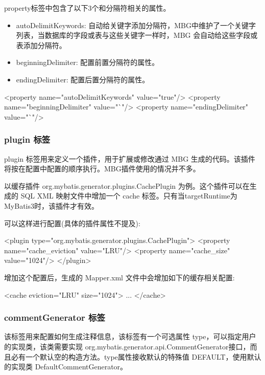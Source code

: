 property标签中包含了以下3个和分隔符相关的属性。
\begin{itemize}
    \item autoDelimitKeywords: 自动给关键字添加分隔符，MBG中维护了一个关键字列表，当数据库的字段或表与这些关键字一样时，MBG 会自动给这些字段或表添加分隔符。
    \item beginningDelimiter: 配置前置分隔符的属性。
    \item endingDelimiter: 配置后置分隔符的属性。
\end{itemize}

\begin{xml}
<property name="autoDelimitKeywords" value="true"/>
<property name="beginningDelimiter" value="`"/>
<property name="endingDelimiter" value="`"/>
\end{xml}

\subsubsection*{plugin 标签}

plugin 标签用来定义一个插件，用于扩展或修改通过 MBG 生成的代码。该插件将按在配置中配置的顺序执行。MBG插件使用的情况并不多。

以缓存插件 org.mybatis.generator.plugins.CachePlugin 为例。这个插件可以在生成的 SQL XML 映射文件中增加一个 cache 标签。只有当targetRuntime为MyBatis3时，该插件才有效。

可以这样进行配置(具体的插件属性不提及):

\begin{xml}
<plugin type="org.mybatis.generator.plugins.CachePlugin">
    <property name="cache_eviction" value="LRU"/>
    <property name="cache_size" value="1024"/>
</plugin>
\end{xml}

增加这个配置后，生成的 Mapper.xml 文件中会增加如下的缓存相关配置:

\begin{xml}
<cache eviction="LRU" size="1024">
...
</cache>
\end{xml}

\subsubsection*{commentGenerator 标签}

该标签用来配置如何生成注释信息，该标签有一个可选属性 type，可以指定用户的实现类，该类需要实现 org.mybatis.generator.api.CommentGenerator接口，而且必有一个默认空的构造方法。type属性接收默认的特殊值 DEFAULT，使用默认的实现类 DefaultCommentGenerator。

